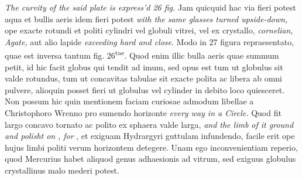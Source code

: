 \pstart \textit{The curvity of the said plate is express'd 26 fig.} Jam quicquid hac via fieri potest aqua et bullis aeris idem fieri potest \textit{with the same glasses turned upside-down,} ope exacte rotundi et politi cylindri vel globuli vitrei, vel ex crystallo, \textit{cornelian, Agate,} aut alio lapide \textit{exceeding hard and close}. Modo in 27 figura repraesentato, quae est inversa tantum fig. 26\textsuperscript{tae}. Quod enim illic bulla aeris quae summum petit, id hic facit globus qui tendit ad imum, sed opus est tum ut globulus sit valde rotundus, tum ut concavitas tabulae sit exacte polita ac libera ab omni pulvere, alioquin posset fieri ut globulus vel cylinder in debito loco quiesceret. Non possum hic quin mentionem faciam curiosae admodum libellae a Christophoro Wrenno\protect{}  pro sumendo horizonte \textit{every way in a Circle.} Quod fit largo concavo tornato ac polito ex sphaera valde larga, \textit{and the limb of it ground and polisht on} \textit{, for} , et exiguam Hydrargyri guttulam infundendo, facile erit ope hujus limbi politi verum horizontem detegere. Unam ego inconvenientiam reperio, quod Mercurius habet aliquod genus adhaesionis ad vitrum, sed exiguus globulus crystallinus malo mederi potest. 
\pend 
